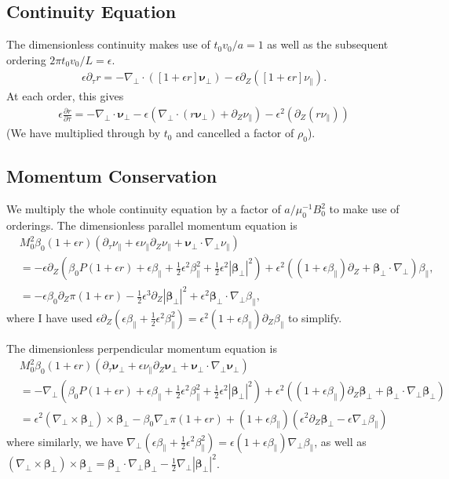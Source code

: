\documentclass{article}
\newcommand{\para}{\parallel}
\newcommand{\ep}{\epsilon}
\newcommand{\np}{\nabla_\perp}
\newcommand{\p}{\partial}
\newcommand{\deriv}[2]{\frac{\p #1}{\p #2}}
\newcommand{\pth} [1] {\left( #1 \right) }
\begin{document}
\subsection{Continuity Equation}
The dimensionless continuity makes use of $t_0v_0/a=1$ as well as the subsequent ordering $2\pi t_0v_0/L = \ep$.
\begin{align}
\ep\p_\tau r = - \np\cdot([1 + \ep r] \bm{\nu}_\perp) - \ep\p_Z([1+\ep r]\nu_\parallel).
\end{align}
At each order, this gives
\begin{align} \label{ndcontinuity}
    \ep\deriv{r}{\tau} = -\np \cdot \bm{\nu}_\perp - 
    \ep \pth{ \np\cdot \pth{r\bm{\nu}_\perp} +  \p_Z\nu_\para} - 
    \ep^2 \pth{\p_Z(r\nu_\para)}
\end{align}
(We have multiplied through by $t_0$ and cancelled a factor of $\rho_0$). 

\subsection{Momentum Conservation}
We multiply the whole continuity equation by a factor of $a/\mu_0^{-1}B_0^2$ to make use of orderings. The dimensionless parallel momentum equation is
\begin{align}  
    & M_0^2\beta_0(1+\ep r)\pth{\p_\tau\nu_\para + \ep\nu_\para\p_Z\nu_\para + \bm{\nu}_\perp\cdot\np\nu_\para} \nonumber \\ 
    &= -\ep\p_Z\pth{\beta_0P(1+\ep r) + \ep\beta_\para + \frac{1}{2}\ep^2\beta_\para^2 + \frac{1}{2}\ep^2|\bm{\beta}_\perp|^2} + \ep^2\pth{(1+\ep\beta_\para)\p_Z + \bm{\beta}_\perp\cdot\np}\beta_\para, \\ 
    &= -\ep\beta_0\p_Z\pi\pth{1+\ep r} - \frac{1}{2}\ep^3\p_Z \left|\bm{\beta}_\perp\right|^2 + \ep^2 \bm{\beta}_\perp\cdot\np\beta_\para, \label{ndmomentumpara}
\end{align}
where I have used $\ep\p_Z\pth{\ep\beta_\para + \frac{1}{2}\ep^2\beta_\para^2} = \ep^2 \pth{1+\ep\beta_\para} \p_Z\beta_\para$ to simplify. 

The dimensionless perpendicular momentum equation is
\begin{align}  
    &M_0^2 \beta_0 (1+\ep r) \pth{\p_\tau \bm{\nu}_\perp + \ep\nu_\para \p_Z\bm{\nu}_\perp + \bm{\nu}_\perp \cdot\np \bm{\nu}_\perp} \nonumber \\ 
    &= -\np \pth{\beta_0 P(1+\ep r) + \ep \beta_\para + \frac{1}{2}\ep^2 \beta_\para^2 + \frac{1}{2}\ep^2 |\bm{\beta}_\perp|^2} + 
    \ep^2 \pth{(1+\ep\beta_\para) \p_Z \bm{\beta}_\perp + \bm{\beta}_\perp \cdot\np \bm{\beta}_\perp} \\ 
    &= \ep^2\pth{\np\times\bm{\beta}_\perp} \times\bm{\beta}_\perp -\beta_0\np\pi\pth{1+\ep r} + \pth{1+\ep\beta_\para} \pth{\ep^2\p_Z\bm{\beta}_\perp - \ep\np\beta_\para} \label{ndmomentumperp}
\end{align}
where similarly, we have $\np\pth{\ep\beta_\para + \frac{1}{2}\ep^2\beta_\para^2} = \ep\pth{1+\ep\beta_\para}\np\beta_\para$, as well as  $\pth{\np\times\bm{\beta}_\perp} \times\bm{\beta}_\perp = \bm{\beta}_\perp\cdot\np\bm{\beta}_\perp - \frac{1}{2}\np|\bm{\beta}_\perp|^2$. 
\end{document}
